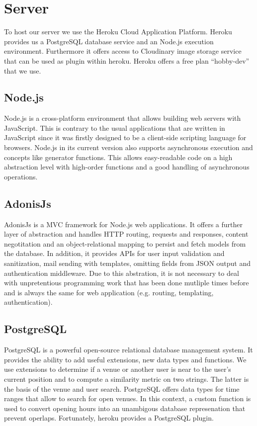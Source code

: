 \documentclass[11pt, accentcolor=tud1c]{tudreport}
\begin{document}
\section{Server}\label{sec:server}
To host our server we use the Heroku Cloud Application Platform\cite{heroku}. Heroku provides us a PostgreSQL\cite{postgresql} database service and an Node.js execution environment. Furthermore it offers access to Cloudinary\cite{cloudinary} image storage service that can be used as plugin within heroku. Heroku offers a free plan ``hobby-dev'' that we use.

\subsection{Node.js}

Node.js \cite{Node.js} is a cross-platform environment that allows building web servers with JavaScript.
This is contrary to the usual applications that are written in JavaScript since it was firstly designed to be a client-side scripting language for browsers. Node.js in its current version also supports asynchronous execution and concepts like generator functions. This allows easy-readable code on a high abstraction level with high-order functions and a good handling of asynchronous operations.

\subsection{AdonisJs}\label{sec:adonisjs}
AdonisJs \cite{adonisjs} is a MVC framework for Node.js web applications. It offers a further layer of abstraction and handles HTTP routing, requests and responses, content negotitation and an object-relational mapping to persist and fetch models from the database. In addition, it provides APIs for user input validation and sanitization, mail sending with templates, omitting fields from JSON output and authentication middleware. Due to this abstration, it is not necessary to deal with unpretentious programming work that has been done mutliple times before and is always the same for web application (e.g. routing, templating, authentication). 

\subsection{PostgreSQL}
PostgreSQL\cite{postgresql} is a powerful open-source relational database management system. It provides the ability to add useful extensions, new data types and functions. We use extensions to determine if a venue or another user is near to the user's current position and to compute a similarity metric on two strings. The latter is the basis of the venue and user search. PostgreSQL offers data types for time ranges that allow to search for open venues. In this context, a custom function is used to convert opening hours into an unambigous database represenation that prevent operlaps. Fortunately, heroku provides a PostgreSQL plugin.
\end{document}
